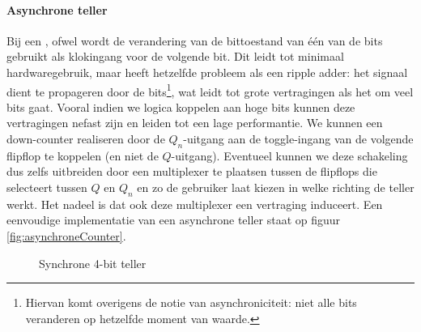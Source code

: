 \paragraph{Asynchrone teller}
Bij een ,  ofwel  wordt de verandering van de bittoestand van \'e\'en van de bits gebruikt als klokingang voor de volgende bit. Dit leidt tot minimaal hardwaregebruik, maar heeft hetzelfde probleem als een ripple adder: het signaal dient te propageren door de bits\footnote{Hiervan komt overigens de notie van asynchroniciteit: niet alle bits veranderen op hetzelfde moment van waarde.}, wat leidt tot grote vertragingen als het om veel bits gaat. Vooral indien we logica koppelen aan hoge bits kunnen deze vertragingen nefast zijn en leiden tot een lage performantie. We kunnen een down-counter realiseren door de $Q_n$-uitgang aan de toggle-ingang van de volgende flipflop te koppelen (en niet de $Q$-uitgang). Eventueel kunnen we deze schakeling dus zelfs uitbreiden door een multiplexer te plaatsen tussen de flipflops die selecteert tussen $Q$ en $Q_n$ en zo de gebruiker laat kiezen in welke richting de teller werkt. Het nadeel is dat ook deze multiplexer een vertraging induceert. Een eenvoudige implementatie van een asynchrone teller staat op figuur \ref{fig:asynchroneCounter}.
\begin{figure}[hbt]
\centering
{}
\caption{Synchrone 4-bit teller}
\end{figure}
